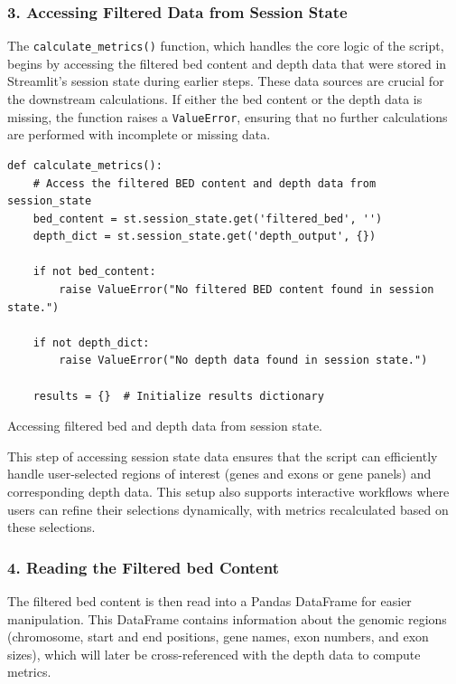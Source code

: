 \subsubsection{\textbf{3. Accessing Filtered Data from Session State}}

The \texttt{calculate\_metrics()} function, which handles the core logic of the script, begins by accessing the filtered \ac{bed} content and depth data that were stored in Streamlit's session state during earlier steps. These data sources are crucial for the downstream calculations. If either the \ac{bed} content or the depth data is missing, the function raises a \texttt{ValueError}, ensuring that no further calculations are performed with incomplete or missing data.

\begin{longlisting}
\begin{verbatim}
def calculate_metrics():
    # Access the filtered BED content and depth data from session_state
    bed_content = st.session_state.get('filtered_bed', '')
    depth_dict = st.session_state.get('depth_output', {})

    if not bed_content:
        raise ValueError("No filtered BED content found in session state.")

    if not depth_dict:
        raise ValueError("No depth data found in session state.")

    results = {}  # Initialize results dictionary
\end{verbatim}
\caption{Accessing filtered \ac{bed} and depth data from session state.}
\label{lbl:metrics_access}
\end{longlisting}

This step of accessing session state data ensures that the script can efficiently handle user-selected regions of interest (genes and exons or gene panels) and corresponding depth data. This setup also supports interactive workflows where users can refine their selections dynamically, with metrics recalculated based on these selections.

\subsubsection{\textbf{4. Reading the Filtered \ac{bed} Content}}

The filtered \ac{bed} content is then read into a Pandas DataFrame for easier manipulation. This DataFrame contains information about the genomic regions (chromosome, start and end positions, gene names, exon numbers, and exon sizes), which will later be cross-referenced with the depth data to compute metrics.

